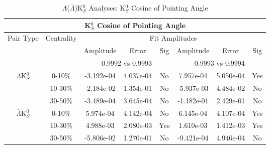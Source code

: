\documentclass[../AnalysisNoteJBuxton.tex]{subfiles}
\begin{document}
\begin{table}
 \centering
 \begin{tabular}{|c|c|c|c|c||c|c|c|}
  \multicolumn{8}{c}{K$^{0}_{S}$ Cosine of Pointing Angle} \\
  \hline
  \multirow{3}{*}{Pair Type} & \multirow{3}{*}{Centrality} & \multicolumn{6}{c|}{Fit Amplitudes} \\
  \cline{3-8}
   & & Amplitude & Error & Sig & Amplitude & Error & Sig \\  
  \cline{3-8}
   & & \multicolumn{3}{c||}{0.9992 vs 0.9993} & \multicolumn{3}{c|}{0.9993 vs 0.9994} \\  
  \hline  
  \multirow{3}{*}{$\Lambda$K$^{0}_{S}$}  
   &  0-10\% & -3.192e-04 & 4.037e-04 & No & 7.957e-04 & 5.050e-04 & Yes \\
   & 10-30\% & -2.184e-02 & 1.354e-01 & No & -5.937e-03 & 4.484e-02 & No \\
   & 30-50\% & -3.489e-04 & 3.645e-04 & No & -1.182e-01 & 2.429e-01 & No \\
  \hline  
  \multirow{3}{*}{$\bar{\Lambda}$K$^{0}_{S}$}  
   &  0-10\% & 5.974e-04 & 4.142e-04 & No & 6.145e-04 & 4.107e-04 & Yes \\
   & 10-30\% & 4.988e-03 & 2.080e-03 & Yes & 1.610e-03 & 1.412e-03 & Yes \\
   & 30-50\% & -5.806e-02 & 1.270e-01 & No & -9.421e-04 & 4.946e-04 & No \\
  \hline
 \end{tabular}
 \caption{$\Lambda$($\bar{\Lambda}$)K$^{0}_{S}$ Analyses: K$^{0}_{S}$ Cosine of Pointing Angle}
 \label{tab:K0CosPointingAngleLamK0}
\end{table}
\end{document}
